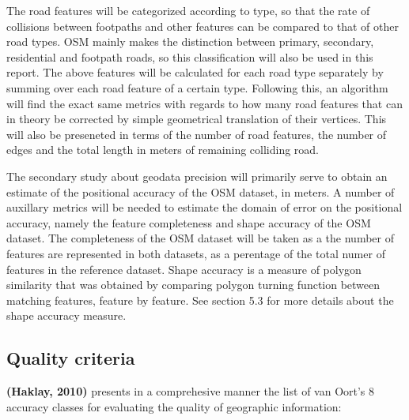 \documentclass{kththesis}
\begin{document}
The road features will be categorized according to type, so that the rate of collisions between footpaths and other features can be compared to that of other road types.
OSM mainly makes the distinction between primary, secondary, residential and footpath roads, so this classification will also be used in this report.
The above features will be calculated for each road type separately by summing over each road feature of a certain type.
Following this, an algorithm will find the exact same metrics with regards to how many road features that can in theory be corrected by simple geometrical translation of their vertices.
This will also be preseneted in terms of the number of road features, the number of edges and the total length in meters of remaining colliding road.

The secondary study about geodata precision will primarily serve to obtain an estimate of the positional accuracy of the OSM dataset, in meters.
A number of auxillary metrics will be needed to estimate the domain of error on the positional accuracy, namely the feature completeness and shape accuracy of the OSM dataset.
The completeness of the OSM dataset will be taken as a the number of features are represented in both datasets, as a perentage of the total numer of features in the reference dataset.
Shape accuracy is a measure of polygon similarity that was obtained by comparing polygon turning function between matching features, feature by feature.
See section 5.3 for more details about the shape accuracy measure.

\subsection{Quality criteria}

\textbf{(Haklay, 2010)} presents in a comprehesive manner the list of van Oort's 8 accuracy classes for evaluating the quality of geographic information:
\end{document}
